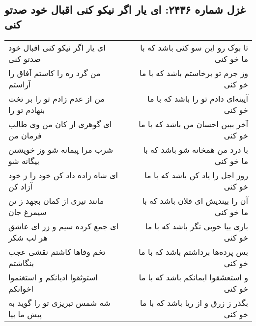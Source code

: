 \begin{center}
\section*{غزل شماره ۲۴۳۶: ای یار اگر نیکو کنی اقبال خود صدتو کنی}
\label{sec:2436}
\begin{longtable}{l p{0.5cm} r}
ای یار اگر نیکو کنی اقبال خود صدتو کنی
&&
تا بوک رو این سو کنی باشد که با ما خو کنی
\\
من گرد ره را کاستم آفاق را آراستم
&&
وز جرم تو برخاستم باشد که با ما خو کنی
\\
من از عدم زادم تو را بر تخت بنهادم تو را
&&
آیینه‌ای دادم تو را باشد که با ما خو کنی
\\
ای گوهری از کان من وی طالب فرمان من
&&
آخر ببین احسان من باشد که با ما خو کنی
\\
شرب مرا پیمانه شو وز خویشتن بیگانه شو
&&
با درد من همخانه شو باشد که با ما خو کنی
\\
ای شاه زاده داد کن خود را ز خود آزاد کن
&&
روز اجل را یاد کن باشد که با ما خو کنی
\\
مانند تیری از کمان بجهد ز تن سیمرغ جان
&&
آن را بیندیش ای فلان باشد که با ما خو کنی
\\
ای جمع کرده سیم و زر ای عاشق هر لب شکر
&&
باری بیا خوبی نگر باشد که با ما خو کنی
\\
تخم وفاها کاشتم نقشی عجب بنگاشتم
&&
بس پرده‌ها برداشتم باشد که با ما خو کنی
\\
استوثقوا ادیانکم و استغنموا اخوانکم
&&
و استعشقوا ایمانکم باشد که با ما خو کنی
\\
شه شمس تبریزی تو را گوید به پیش ما بیا
&&
بگذر ز زرق و از ریا باشد که با ما خو کنی
\\
\end{longtable}
\end{center}
